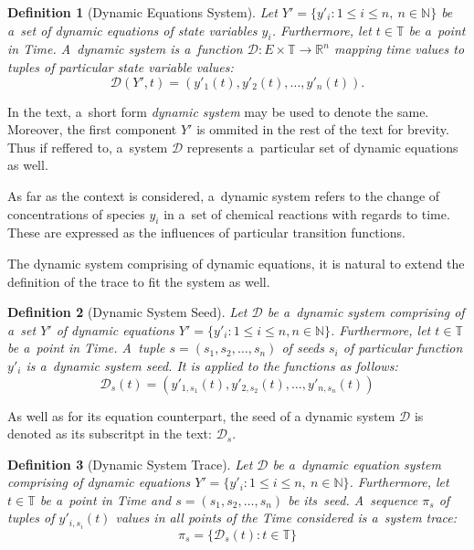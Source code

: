 \documentclass[12pt,oneside,draft]{fithesis}
\newcommand{\mD}{\mathcal{D}}
\newcommand{\mReal}{\mathbb{R}}
\newcommand{\mNatural}{\mathbb{N}}
\newcommand{\mTime}{\mathbb{T}}
\newtheorem{mydef}{Definition}
\begin{document}
\begin{mydef}[Dynamic Equations System]
Let $Y'=\{y'_i:1\leq{}i\leq{}n,\:n\in\mNatural\}$ be a~set of dynamic
equations of state variables $y_i$.
Furthermore, let $t\in\mTime$ be a~point in Time.
A~dynamic system is a~function
$\mD:E\times\mTime\rightarrow\mReal^n$ mapping
time values to tuples of particular state variable values:
	\begin{equation}
		\mD(Y',t)=(y'_{1}(t),y'_{2}(t),\dotsc,y'_{n}(t)).
	\end{equation}
\end{mydef}
In the text, a~short form \emph{dynamic system} may be used to denote
the same. Moreover, the first component $Y'$ is ommited in
the rest of the text for brevity. Thus if reffered to, a~system $\mD$
represents a~particular set of dynamic equations as well.

As far as the context is considered, a~dynamic system refers
to the change of concentrations of species $y_i$ in a~set of chemical
reactions with regards to time. These are expressed as the influences
of particular transition functions.

The dynamic system comprising of dynamic equations, it is natural to
extend the definition of the trace to fit the system as well.

\begin{mydef}[Dynamic System Seed]
Let $\mD$ be a~dynamic system comprising of a~set $Y'$ of dynamic
equations $Y'=\{y'_i:1\leq{}i\leq{}n,n\in\mNatural\}$.
Furthermore, let $t\in\mTime$ be a~point in Time.
A~tuple $s=(s_1,s_2,\dotsc,s_n)$ of seeds $s_i$ of particular
function $y'_i$ is a~dynamic system seed. It is applied to the functions
as follows:
	\begin{equation}
		\mD_s{}(t)=(y'_{1,s_1}(t),y'_{2,s_2}(t),\dotsc{},y'_{n,s_n}(t))
	\end{equation}
\end{mydef}
As well as for its equation counterpart, the seed of a dynamic system
$\mD$ is denoted as its subscritpt in the text: $\mD_s$.

\begin{mydef}[Dynamic System Trace]
Let $\mD$ be a~dynamic equation system comprising of dynamic equations
$Y'=\{y'_i:1\leq{}i\leq{}n,\:n\in\mNatural\}$. Furthermore, let
$t\in\mTime$ be a~point in Time and $s=(s_1,s_2,\dotsc,s_n)$ be
its~seed. A~sequence $\pi_s$ of tuples of $y'_{i,s_i}(t)$ values in all
points of the Time considered is a~system trace:
	\begin{equation}
		\pi_s=\{\mD_s{}(t): t\in\mTime\}
	\end{equation}
\end{mydef}
\end{document}
